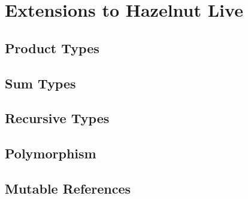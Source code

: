 \newcommand{\extensionsSec}{Extensions to Hazelnut Live}
\section{\protect\extensionsSec} %
\label{sec:extensions}
\subsection{Product Types}

\subsection{Sum Types}

\subsection{Recursive Types}

\subsection{Polymorphism}

\subsection{Mutable References}

